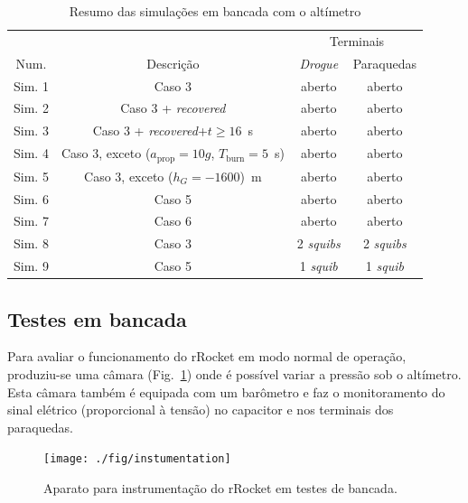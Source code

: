 \documentclass[12pt,a4paper]{article}
\begin{document}
\begin{table}[!ht]
	\centering
	\caption{Resumo das simulações em bancada com o altímetro}
	\begin{tabular}{cccc}
		\toprule
		&&\multicolumn{2}{c}{Terminais}\\\cmidrule{3-4}
		Num.&Descrição&\textit{Drogue}&Paraquedas\\
		\midrule
		Sim. 1 & Caso 3 & aberto&  aberto\\
		Sim. 2 & Caso 3 + \textit{recovered} & aberto&  aberto\\
		Sim. 3 & Caso 3 + \textit{recovered}+$t\ge 16$~s& aberto&  aberto\\
		Sim. 4 & Caso 3, exceto ($a_\text{prop}=10g$, $T_\text{burn}=5$~s)& aberto&  aberto\\
		Sim. 5 & Caso 3, exceto ($h_G=-1600$)~m& aberto&  aberto\\
		Sim. 6 & Caso 5 &  aberto&  aberto\\
		Sim. 7 & Caso 6 &  aberto&  aberto\\
		\midrule
		Sim. 8 & Caso 3 & 2 \textit{squibs}&  2 \textit{squibs}\\
		Sim. 9 & Caso 5 & 1 \textit{squib}&  1 \textit{squib}\\
		\bottomrule
	\end{tabular}
	\label{tab:simulations}
\end{table}

\subsection{Testes em bancada}

Para avaliar o funcionamento do rRocket em modo normal de operação, produziu-se uma câmara (Fig.~\ref{fig:instrumentation}) onde é possível variar a pressão sob o altímetro. Esta câmara também é equipada com um barômetro e faz o monitoramento do sinal elétrico (proporcional à tensão) no capacitor e nos terminais dos paraquedas.
\begin{figure}[!ht]
	\centering
	\texttt{[image: ./fig/instumentation]}
	\caption{Aparato para instrumentação do rRocket em testes de bancada.}
	\label{fig:instrumentation}
\end{figure}
\end{document}
